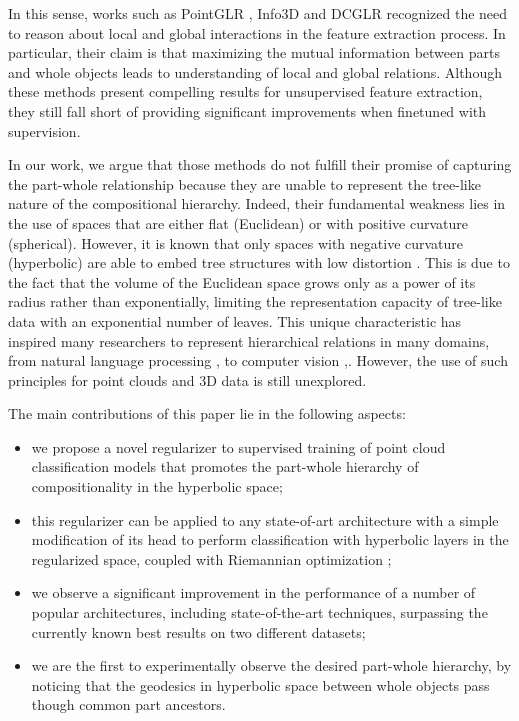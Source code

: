\documentclass{article}
\begin{document}
In this sense, works such as PointGLR \cite{rao2020global}, Info3D \cite{sanghi2020info3d} and DCGLR \cite{fu2022distillation} recognized the need to reason about local and global interactions in the feature extraction process. In particular, their claim is that maximizing the mutual information between parts and whole objects leads to understanding of local and global relations. Although these methods present compelling results for unsupervised feature extraction, they still fall short of providing significant improvements when finetuned with supervision.

In our work, we argue that those methods do not fulfill their promise of capturing the part-whole relationship because they are unable to represent the tree-like nature of the compositional hierarchy. Indeed, their fundamental weakness lies in the use of spaces that are either flat (Euclidean) or with positive curvature (spherical). However, it is known that only spaces with negative curvature (hyperbolic) are able to embed tree structures with low distortion \cite{sarkar2011low}. This is due to the fact that the volume of the Euclidean space grows only as a power of its radius rather than exponentially, limiting the representation capacity of tree-like data with an exponential number of leaves. This unique characteristic has inspired many researchers to represent hierarchical relations in many domains, from natural language processing \cite{nickel2017poincare},\cite{ganea2018hyperbolic} to computer vision \cite{weng2021unsupervised} ,\cite{hsu2021capturing}. However, the use of such principles for point clouds and 3D data is still unexplored.

The main contributions of this paper lie in the following aspects:
\begin{itemize}
    \item we propose a novel regularizer to supervised training of point cloud classification models that promotes the part-whole hierarchy of compositionality in the hyperbolic space;
    \item this regularizer can be applied to any state-of-art architecture with a simple modification of its head to perform classification with hyperbolic layers in the regularized space, coupled with Riemannian optimization \cite{becigneul2018riemannian};
    \item we observe a significant improvement in the performance of a number of popular architectures, including state-of-the-art techniques, surpassing the currently known best results on two different datasets;
    \item we are the first to experimentally observe the desired part-whole hierarchy, by noticing that the geodesics in hyperbolic space between whole objects pass though common part ancestors.
\end{itemize}
\end{document}
